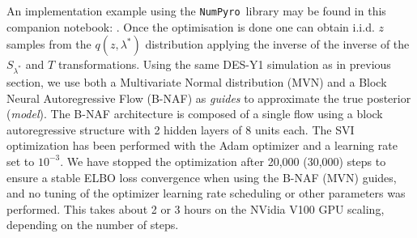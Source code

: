\documentclass[twocolumn,twocolappendix,nofootinbib,iop]{openjournal}
\newcommand{\nblink}[1]{\href{https://github.com/DifferentiableUniverseInitiative/jax-cosmo-paper/blob/master/notebooks/#1.ipynb}{\faFileCodeO}}
\newcommand{\FrL}[1]{{\color{cyan}FL: #1}}
\newcommand{\JZ}[1]{{\color{purple}JZ: #1}}
\newcommand{\JEC}[1]{{\color{magenta}JEC: #1}}
\newcommand{\numpyro}{\texttt{NumPyro}}
\begin{document}
%
An implementation example using the \numpyro\ library may be found in this companion notebook: \nblink{DES_Y1_SVI_and_NeutraReparam}.
%
Once the optimisation is done one can obtain  i.i.d. $z$ samples from the $q(z,\lambda^\ast)$ distribution  applying the inverse of the inverse of the $S_{\lambda^\ast}$ and $T$ transformations. Using the same DES-Y1 simulation as in previous section, we use both a Multivariate Normal distribution (MVN) and a Block Neural Autoregressive Flow (B-NAF) \citep{pmlr-v115-de-cao20a} as \textit{guides} to approximate the true posterior (\textit{model}). The B-NAF architecture is composed of a single flow using a block autoregressive structure with 2 hidden layers of 8 units each. The SVI optimization has been performed with the Adam optimizer \citep{KingmaB14} and a learning rate set to $10^{-3}$. We have stopped the optimization after 20,000 (30,000) steps to ensure a stable ELBO loss convergence when using the B-NAF (MVN) guides, and no tuning of the optimizer learning rate scheduling or other parameters was performed. This takes about 2 or 3 hours on the NVidia V100 GPU scaling, depending on the number of steps.  
\end{document}
